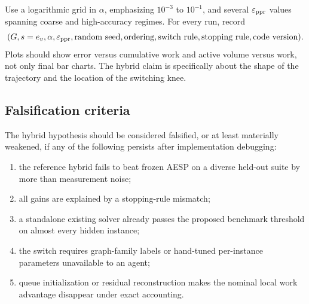 Use a logarithmic grid in \(\alpha\), emphasizing
\(
10^{-3}\) to \(10^{-1}
\), and several \(\varepsilon_{\mathrm{ppr}}\) values spanning coarse and high-accuracy regimes.
For every run, record
\begin{equation}
   (G,s=e_v,\alpha,\varepsilon_{\mathrm{ppr}},\text{random seed},\text{ordering},
    \text{switch rule},
    \text{stopping rule},\text{code version}).
    \label{eq:experiment-metadata}
\end{equation}
Plots should show error versus cumulative work and active volume versus work,
not only final bar charts.  The hybrid claim is specifically about the shape
of the trajectory and the location of the switching knee.

\subsection{Falsification criteria}

The hybrid hypothesis should be considered falsified, or at least materially
weakened, if any of the following persists after implementation debugging:
\begin{enumerate}[leftmargin=2em]
\item the reference hybrid fails to beat frozen AESP on a diverse held-out
      suite by more than measurement noise;
\item all gains are explained by a stopping-rule mismatch;
\item a standalone existing solver already passes the proposed benchmark
      threshold on almost every hidden instance;
\item the switch requires graph-family labels or hand-tuned per-instance
      parameters unavailable to an agent;
\item queue initialization or residual reconstruction makes the nominal local
      work advantage disappear under exact accounting.
\end{enumerate}
